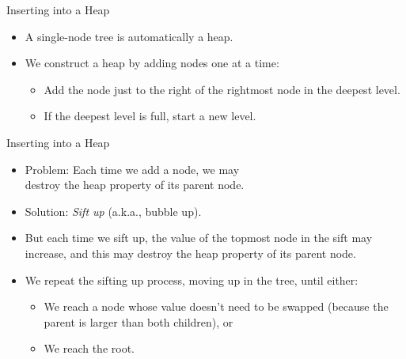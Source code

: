 \documentclass[14pt,aspectratio=1610]{beamer}
\begin{document}
\begin{frame}{Inserting into a Heap}
\begin{itemize}[<+->]
\item
  A single-node tree is automatically a heap.
\item
  We construct a heap by adding nodes one at a time:
  \begin{itemize}
  \item
    Add the node just to the right of the rightmost node in the deepest level.
  \item
    If the deepest level is full, start a new level.
  \end{itemize}
\end{itemize}
\end{frame}


\begin{frame}{Inserting into a Heap}
\begin{itemize}[<+->]
\item
  Problem: Each time we add a node, we may\\ destroy the heap property of its parent node.
\item
  Solution: \emph{Sift up} (a.k.a., bubble up).
\item
  But each time we sift up, the value of the topmost node in the sift may increase, and this may destroy the heap property of its parent node.
\item
  We repeat the sifting up process, moving up in the tree, until either:
  \begin{itemize}
  \item
    We reach a node whose value doesn't need to be swapped (because the parent is larger than both children), or
  \item
    We reach the root.
  \end{itemize}
\end{itemize}
\end{frame}
\end{document}
